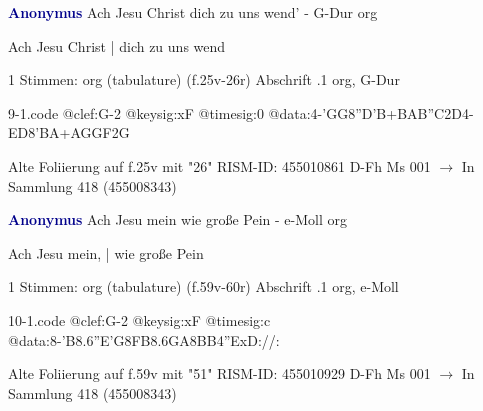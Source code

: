 \documentclass[twocolumn]{book}
\begin{document}
\newline \par \vspace{7pt} \textcolor{darkblue}{\textbf{Anonymus  }}
\newline Ach Jesu Christ dich zu uns wend' - G-Dur
\newline org
\newline \begin{itshape}[f.25v, at left:] Ach Jesu Christ | dich zu uns wend\end{itshape} 
\newline \textcolor{darkblue}{}  1 Stimmen: org (tabulature)  (f.25v-26r)
\newline Abschrift
.1  org, G-Dur  
\begin{filecontents*}{9-1.code}
@clef:G-2
@keysig:xF
@timesig:0
@data:4-'GG{8''D'B+}{BAB''C}2D4-ED{8'BA+}{AGGF}2G
\end{filecontents*}
\newline
%
\newline Alte Foliierung auf f.25v mit "26"
\newline RISM-ID: 455010861
\newline D-Fh  Ms 001
\newline $\rightarrow$ In Sammlung 418 (455008343)
      
\newline \par \vspace{7pt} \textcolor{darkblue}{\textbf{Anonymus  }}
\newline Ach Jesu mein wie große Pein - e-Moll
\newline org
\newline \begin{itshape}[f.59v, at left:] Ach Jesu mein, | wie große Pein\end{itshape} 
\newline \textcolor{darkblue}{}  1 Stimmen: org (tabulature)  (f.59v-60r)
\newline Abschrift
.1  org, e-Moll  
\begin{filecontents*}{10-1.code}
@clef:G-2
@keysig:xF
@timesig:c
@data:8-{'B8.6''E'G}{8FB8.6GA}{8BB}4''ExD://:
\end{filecontents*}
\newline
%
\newline Alte Foliierung auf f.59v mit "51"
\newline RISM-ID: 455010929
\newline D-Fh  Ms 001
\newline $\rightarrow$ In Sammlung 418 (455008343)
      
\end{document}
